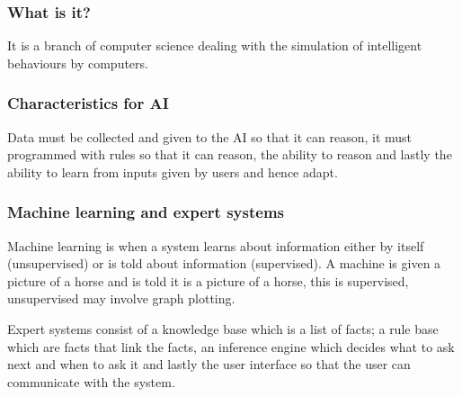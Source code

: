 \documentclass{article}
\begin{document}
\subsubsection{What is it?}
It is a branch of computer science dealing with the simulation of intelligent behaviours
by computers.
\subsubsection{Characteristics for AI}
Data must be collected and given to the AI so that it can reason, it must programmed
with rules so that it can reason, the ability to reason and lastly the ability to learn
from inputs given by users and hence adapt.

\subsubsection{Machine learning and expert systems}
Machine learning is when a system learns about information either by itself
(unsupervised) or is told about information (supervised). A machine is given a picture
of a horse and is told it is a picture of a horse, this is supervised, unsupervised
may involve graph plotting.

Expert systems consist of a knowledge base which is a list of facts; a rule base which
are facts that link the facts, an inference engine which decides what to ask next and
when to ask it and lastly the user interface so that the user can communicate with the
system.
\end{document}
